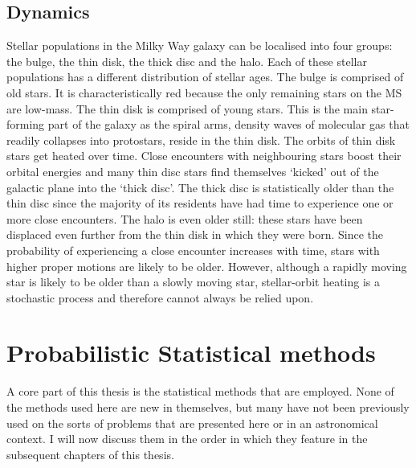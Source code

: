 \subsection{Dynamics}
Stellar populations in the Milky Way galaxy can be localised into four groups:
the bulge, the thin disk, the thick disc and the halo.
Each of these stellar populations has a different distribution of stellar
ages.
The bulge is comprised of old stars.
It is characteristically red because the only remaining stars on the MS are
low-mass.
The thin disk is comprised of young stars.
This is the main star-forming part of the galaxy as the spiral arms, density
waves of molecular gas that readily collapses into protostars, reside in the
thin disk.
The orbits of thin disk stars get heated over time.
Close encounters with neighbouring stars boost their orbital energies and many
thin disc stars find themselves `kicked' out of the galactic plane into the
`thick disc'.
The thick disc is statistically older than the thin disc since the majority of
its residents have had time to experience one or more close encounters.
The halo is even older still: these stars have been displaced even further
from the thin disk in which they were born.
Since the probability of experiencing a close encounter increases with time,
stars with higher proper motions are likely to be older.
However, although a rapidly moving star is likely to be older than a slowly
moving star, stellar-orbit heating is a stochastic process and therefore
cannot always be relied upon.

\section{Probabilistic Statistical methods}

A core part of this thesis is the statistical methods that are employed.
None of the methods used here are new in themselves, but many have not been
previously used on the sorts of problems that are presented here or in an
astronomical context.
I will now discuss them in the order in which they feature in the subsequent
chapters of this thesis.

